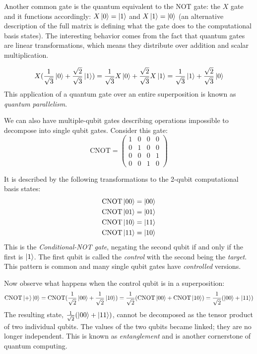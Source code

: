 Another common gate is the quantum equivalent to the $\text{NOT}$ gate: the $X$ gate and it functions accordingly: $X\ket{0} = \ket{1}$ and $X\ket{1} = \ket{0}$ (an alternative description of the full matrix is defining what the gate does to the computational basis states).
The interesting behavior comes from the fact that quantum gates are linear transformations, which means they distribute over addition and scalar multiplication.

\begin{equation*}
    X(\frac{1}{\sqrt3}\ket{0} + \frac{\sqrt2}{\sqrt3}\ket{1}) = \frac{1}{\sqrt3}X\ket{0} + \frac{\sqrt2}{\sqrt3}X\ket{1} = \frac{1}{\sqrt3}\ket{1} + \frac{\sqrt2}{\sqrt3}\ket{0}
\end{equation*}
This application of a quantum gate over an entire superposition is known as \emph{quantum parallelism}.

We can also have multiple-qubit gates describing operations impossible to decompose into single qubit gates.
Consider this gate:
\begin{equation*}
    \text{CNOT} = \begin{pmatrix} 
1 & 0 & 0 & 0 \\ 
0 & 1 & 0 & 0 \\ 
0 & 0 & 0 & 1 \\ 
0 & 0 & 1 & 0 
\end{pmatrix}
\end{equation*}

It is described by the following transformations to the 2-qubit computational basis states:
\begin{equation*}
    \begin{aligned}
    \text{CNOT} \ket{00} &= \ket{00} \\
    \text{CNOT} \ket{01} &= \ket{01} \\
    \text{CNOT} \ket{10} &= \ket{11} \\
    \text{CNOT} \ket{11} &= \ket{10}
\end{aligned}
\end{equation*}
This is the \emph{Conditional-NOT gate}, negating the second qubit if and only if the first is $\ket{1}$.
The first qubit is called the \emph{control} with the second being the \emph{target}.
This pattern is common and many single qubit gates have \emph{controlled} versions.

Now observe what happens when the control qubit is in a superposition:
\begin{equation*}
    \text{CNOT}\ket{+}\ket{0} = \text{CNOT}(\frac{1}{\sqrt2}\ket{00} + \frac{1}{\sqrt2}\ket{10}) = \frac{1}{\sqrt2}(\text{CNOT}\ket{00} + \text{CNOT}\ket{10}) = \frac{1}{\sqrt2}(\ket{00} + \ket{11})
\end{equation*}
The resulting state, $\frac{1}{\sqrt2}(\ket{00} + \ket{11})$, cannot be decomposed as the tensor product of two individual qubits.
The values of the two qubits became linked; they are no longer independent. This is known as \emph{entanglement} and is another cornerstone of quantum computing. 

